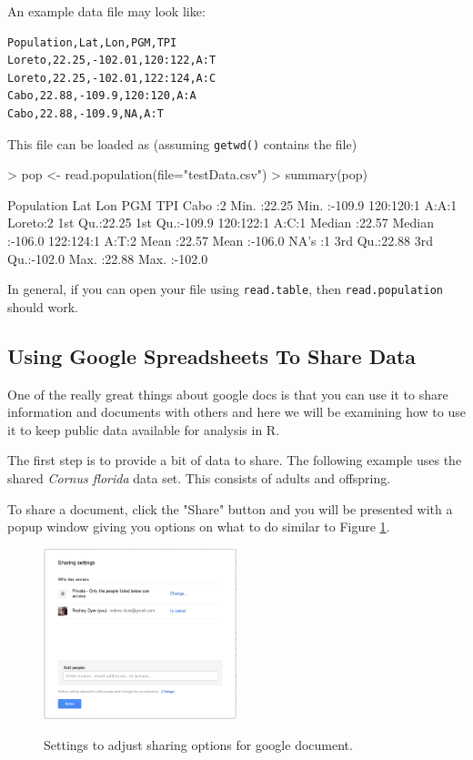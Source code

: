 \documentclass[letterpaper,twoside,openany]{book}
\begin{document}
An example data file may look like:

\begin{verbatim}
Population,Lat,Lon,PGM,TPI
Loreto,22.25,-102.01,120:122,A:T
Loreto,22.25,-102.01,122:124,A:C
Cabo,22.88,-109.9,120:120,A:A
Cabo,22.88,-109.9,NA,A:T
\end{verbatim}

This file can be loaded as (assuming \texttt{getwd()} contains the file)

\begin{Schunk}
\begin{Sinput}
> pop <- read.population(file="testData.csv")
> summary(pop)
\end{Sinput}
\begin{Soutput}
  Population      Lat             Lon              PGM     TPI   
 Cabo  :2    Min.   :22.25   Min.   :-109.9   120:120:1   A:A:1  
 Loreto:2    1st Qu.:22.25   1st Qu.:-109.9   120:122:1   A:C:1  
             Median :22.57   Median :-106.0   122:124:1   A:T:2  
             Mean   :22.57   Mean   :-106.0   NA's   :1          
             3rd Qu.:22.88   3rd Qu.:-102.0                      
             Max.   :22.88   Max.   :-102.0                      
\end{Soutput}
\end{Schunk}

In general, if you can open your file using \texttt{read.table}, then \texttt{read.population} should work.



\subsection{Using Google Spreadsheets To Share Data}

One of the really great things about google docs is that you can use it to share information and documents with others and here we will be examining how to use it to keep public data available for analysis in R.


The first step is to provide a bit of data to share.  The following example uses the shared \emph{Cornus florida} data set.  This consists of adults and offspring.

To share a document, click the "Share" button and you will be presented with a popup window giving you options on what to do similar to Figure \ref{fig:SharingSettings}.

\begin{figure}[h!]
	\centering
	\includegraphics[width=0.5\textwidth]{SharingSettings}
	\label{fig:SharingSettings}
	\caption{Settings to adjust sharing options for google document.}
\end{figure}
\end{document}
